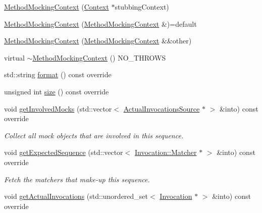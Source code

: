 \begin{DoxyCompactItemize}
\item 
\mbox{\hyperlink{classfakeit_1_1MethodMockingContext_aa5d0708f0a044fbc8080f64091f8aa71}{Method\+Mocking\+Context}} (\mbox{\hyperlink{structfakeit_1_1MethodMockingContext_1_1Context}{Context}} $\ast$stubbing\+Context)
\item 
\mbox{\hyperlink{classfakeit_1_1MethodMockingContext_aff21ad1769db1e3f81decc54c4b43ed3}{Method\+Mocking\+Context}} (\mbox{\hyperlink{classfakeit_1_1MethodMockingContext}{Method\+Mocking\+Context}} \&)=default
\item 
\mbox{\hyperlink{classfakeit_1_1MethodMockingContext_af4dcf1f0a24f7cedd1d4c5ee23d1a313}{Method\+Mocking\+Context}} (\mbox{\hyperlink{classfakeit_1_1MethodMockingContext}{Method\+Mocking\+Context}} \&\&other)
\item 
virtual \mbox{\hyperlink{classfakeit_1_1MethodMockingContext_a92068a8b1affe1c7be6eafc12297c8c2}{$\sim$\+Method\+Mocking\+Context}} () N\+O\+\_\+\+T\+H\+R\+O\+WS
\item 
std\+::string \mbox{\hyperlink{classfakeit_1_1MethodMockingContext_a0e71b77ab7f91d629a5853542d48624a}{format}} () const override
\item 
unsigned int \mbox{\hyperlink{classfakeit_1_1MethodMockingContext_a47e66f1a704bad7681f70a3e612d08a6}{size}} () const override
\item 
void \mbox{\hyperlink{classfakeit_1_1MethodMockingContext_ac66ba7b51a3c845b8fe8f2fa0f5f5ff0}{get\+Involved\+Mocks}} (std\+::vector$<$ \mbox{\hyperlink{structfakeit_1_1ActualInvocationsSource}{Actual\+Invocations\+Source}} $\ast$ $>$ \&into) const override
\begin{DoxyCompactList}\small\item\em Collect all mock objects that are involved in this sequence. \end{DoxyCompactList}\item 
void \mbox{\hyperlink{classfakeit_1_1MethodMockingContext_ab88d912b17801968fab8443079e2eabc}{get\+Expected\+Sequence}} (std\+::vector$<$ \mbox{\hyperlink{structfakeit_1_1Invocation_1_1Matcher}{Invocation\+::\+Matcher}} $\ast$ $>$ \&into) const override
\begin{DoxyCompactList}\small\item\em Fetch the matchers that make-\/up this sequence. \end{DoxyCompactList}\item 
void \mbox{\hyperlink{classfakeit_1_1MethodMockingContext_ad6803405abfd419799882f837d6f56b6}{get\+Actual\+Invocations}} (std\+::unordered\+\_\+set$<$ \mbox{\hyperlink{structfakeit_1_1Invocation}{Invocation}} $\ast$ $>$ \&into) const override

\end{DoxyCompactItemize}

